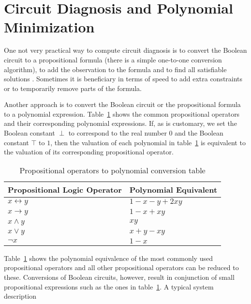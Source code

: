 \documentclass{article}
\begin{document}
\section{Circuit Diagnosis and Polynomial Minimization}
%
One not very practical way to compute circuit diagnosis is to convert
the Boolean circuit to a propositional formula (there is a simple
one-to-one conversion algorithm), to add the observation to the
formula and to find all satisfiable solutions \cite{?}. Sometimes it
is beneficiary in terms of speed to add extra constraints or to
temporarily remove parts of the formula.
\par
Another approach is to convert the Boolean circuit or the
propositional formula to a polynomial
expression. Table~\ref{tbl:polynomial_conversion} shows the common
propositional operators and their corresponding polynomial
expressions. If, as is customary, we set the Boolean constant $\perp$
to correspond to the real number $0$ and the Boolean constant $\top$
to $1$, then the valuation of each polynomial in
table~\ref{tbl:polynomial_conversion} is equivalent to the valuation
of its corresponding propositional operator.
%
\begin{table}[hbt]
\begin{center}
\begin{tabular}{ll}
\toprule
Propositional Logic Operator & Polynomial Equivalent \\
\midrule
$x \leftrightarrow y$        & $1 - x - y + 2xy$     \\
$x \rightarrow y$            & $1 - x + xy$          \\
$x \wedge y$                 & $xy$                  \\
$x \vee y$                   & $x + y - xy$          \\
$\neg{x}$                    & $1 - x$               \\
\bottomrule
\end{tabular}
\caption{Propositional operators to polynomial conversion table\label{tbl:polynomial_conversion}}
\end{center}
\end{table}
\par
Table~\ref{tbl:polynomial_conversion} shows the polynomial equivalence
of the most commonly used propositional operators and all other
propositional operators can be reduced to these. Conversions of
Boolean circuits, however, result in conjunction of small
propositional expressions such as the ones in
table~\ref{tbl:polynomial_conversion}. A typical system description
\end{document}
